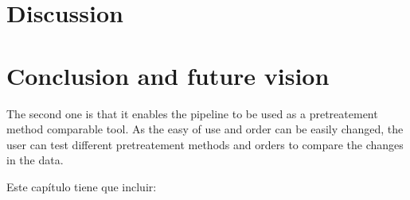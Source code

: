 \documentclass[ENG, BIB]{TFUOC}%
\begin{document}
\chapter{Discussion}

\chapter{Conclusion and future vision}
The second one is that it enables the pipeline to be used as a pretreatement method comparable tool. As the easy of use and order can be easily changed, the user can test different pretreatement methods and orders to compare the changes in the data.

Este capítulo tiene que incluir:
\end{document}
